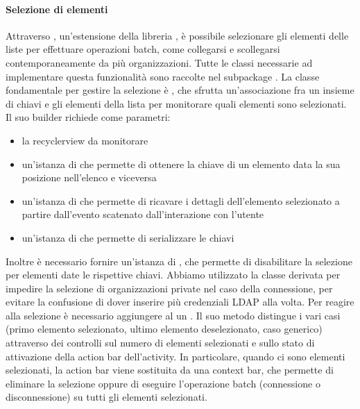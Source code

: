\documentclass[../../manuale-manutentore.tex]{subfiles}
\begin{document}
\paragraph{Selezione di elementi}%
\label{par:selezione_di_elementi}
Attraverso , un'estensione della libreria , è possibile selezionare gli elementi delle liste per effettuare operazioni batch, come collegarsi e scollegarsi contemporaneamente da più organizzazioni.
Tutte le classi necessarie ad implementare questa funzionalità sono raccolte nel subpackage .
La classe fondamentale per gestire la selezione è \linebreak{}, che sfrutta un'associazione fra un insieme di chiavi e gli elementi della lista per monitorare quali elementi sono selezionati.
Il suo builder richiede come parametri:
\begin{itemize}
  \item la recyclerview da monitorare
  \item un'istanza di  che permette di ottenere la chiave di un elemento data la sua posizione nell'elenco e viceversa
  \item un'istanza di \linebreak{} che permette di ricavare i dettagli dell'elemento selezionato a partire dall'evento scatenato dall'interazione con l'utente
  \item un'istanza di  che permette di serializzare le chiavi
\end{itemize}

Inoltre è necessario fornire un'istanza di , che permette di disabilitare la selezione per elementi date le rispettive chiavi.
Abbiamo utilizzato la classe derivata  per impedire la selezione di organizzazioni private nel caso della connessione, per evitare la confusione di dover inserire più credenziali LDAP alla volta.
Per reagire alla selezione è necessario aggiungere al  un .
Il suo metodo  distingue i vari casi (primo elemento selezionato, ultimo elemento deselezionato, caso generico) attraverso dei controlli sul numero di elementi selezionati e sullo stato di attivazione della action bar dell'activity.
In particolare, quando ci sono elementi selezionati, la action bar viene sostituita da una context bar, che permette di eliminare la selezione oppure di eseguire l'operazione batch (connessione o disconnessione) su tutti gli elementi selezionati.
\end{document}
